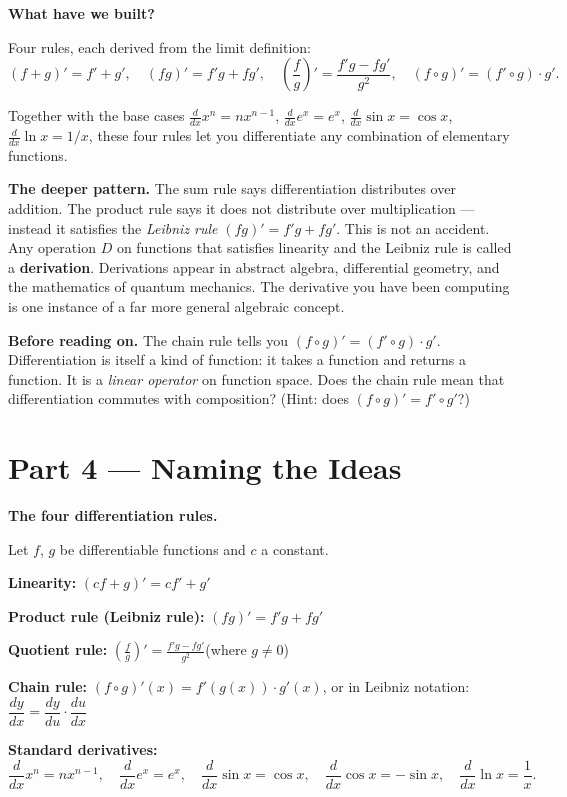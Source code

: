 \documentclass[12pt, a4paper]{article}
\begin{document}
\begin{discoverybox}
\textbf{What have we built?}

Four rules, each derived from the limit definition:
\[
  (f+g)' = f'+g', \quad (fg)' = f'g + fg', \quad \left(\frac{f}{g}\right)' = \frac{f'g - fg'}{g^2}, \quad (f\circ g)' = (f'\circ g)\cdot g'.
\]

Together with the base cases $\frac{d}{dx}x^n = nx^{n-1}$, $\frac{d}{dx}e^x = e^x$, $\frac{d}{dx}\sin x = \cos x$, $\frac{d}{dx}\ln x = 1/x$, these four rules let you differentiate any combination of elementary functions.

\medskip
\textbf{The deeper pattern.} The sum rule says differentiation distributes over addition. The product rule says it does not distribute over multiplication --- instead it satisfies the \emph{Leibniz rule} $(fg)' = f'g + fg'$. This is not an accident. Any operation $D$ on functions that satisfies linearity and the Leibniz rule is called a \textbf{derivation}. Derivations appear in abstract algebra, differential geometry, and the mathematics of quantum mechanics. The derivative you have been computing is one instance of a far more general algebraic concept.

\medskip
\textbf{Before reading on.} The chain rule tells you $(f\circ g)' = (f'\circ g)\cdot g'$. Differentiation is itself a kind of function: it takes a function and returns a function. It is a \emph{linear operator} on function space. Does the chain rule mean that differentiation commutes with composition? (Hint: does $(f\circ g)' = f'\circ g'$?)
\end{discoverybox}

\section{Part 4 \texorpdfstring{---}{--} Naming the Ideas}

\begin{namebox}
\textbf{The four differentiation rules.}

Let $f$, $g$ be differentiable functions and $c$ a constant.

\medskip
\textbf{Linearity:} $(cf + g)' = cf' + g'$

\medskip
\textbf{Product rule (Leibniz rule):} $(fg)' = f'g + fg'$

\medskip
\textbf{Quotient rule:} $\displaystyle\left(\frac{f}{g}\right)' = \frac{f'g - fg'}{g^2}$\quad (where $g \neq 0$)

\medskip
\textbf{Chain rule:} $(f \circ g)'(x) = f'(g(x))\cdot g'(x)$, \quad or in Leibniz notation: $\dfrac{dy}{dx} = \dfrac{dy}{du}\cdot\dfrac{du}{dx}$

\medskip
\textbf{Standard derivatives:}
\[
  \frac{d}{dx}x^n = nx^{n-1}, \quad
  \frac{d}{dx}e^x = e^x, \quad
  \frac{d}{dx}\sin x = \cos x, \quad
  \frac{d}{dx}\cos x = -\sin x, \quad
  \frac{d}{dx}\ln x = \frac{1}{x}.
\]
\end{namebox}
\end{document}
